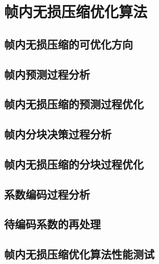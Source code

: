 \chapter{帧内无损压缩优化算法}
\label{cha:c3}

\section{帧内无损压缩的可优化方向}

\section{帧内预测过程分析}

\section{帧内无损压缩的预测过程优化}

\section{帧内分块决策过程分析}

\section{帧内无损压缩的分块过程优化}

\section{系数编码过程分析}

\section{待编码系数的再处理}

\section{帧内无损压缩优化算法性能测试}